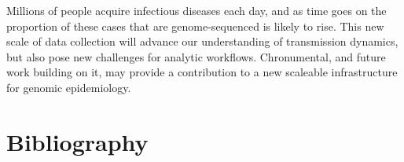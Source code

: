 Millions of people acquire infectious diseases each day, and as time goes on the proportion of these cases that are genome-sequenced is likely to rise. This new scale of data collection will advance our understanding of transmission dynamics, but also pose new challenges for analytic workflows. Chronumental, and future work building on it, may provide a contribution to a new scaleable infrastructure for genomic epidemiology.






\section*{Bibliography}


